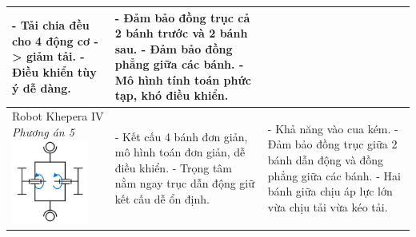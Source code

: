\begin{longtable}{|p{4cm}|p{5cm}|p{5cm}|}
                - Tải chia đều cho 4 động cơ -> giảm tải. \newline
                - Điều khiển tùy ý dễ dàng. &
                - Đảm bảo đồng trục cả 2 bánh trước và 2 bánh sau. \newline
                - Đảm bảo đồng phẳng giữa các bánh. \newline
                - Mô hình tính toán phức tạp, khó điều khiển. \\ 
                \hline
                Robot Khepera IV \newline
                \textit{Phương án 5} \newline
                \includegraphics[width=2.5cm]{pictures/chapter2/chapter2_pic_5.png} &
                - Kết cấu 4 bánh đơn giản, mô hình toán đơn giản, dễ điều khiển.\newline 
                - Trọng tâm nằm ngay trục dẫn động giữ kết cấu dễ ổn định. &
                - Khả năng vào cua kém. \newline
                - Đảm bảo đồng trục giữa 2 bánh dẫn động và đồng phẳng giữa các bánh. \newline
                - Hai bánh giữa chịu áp lực lớn vừa chịu tải vừa kéo tải. \\
                \hline
                
            \end{longtable}
